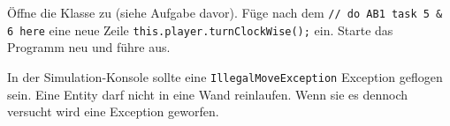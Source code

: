 Öffne die Klasse zu  (siehe Aufgabe davor).
Füge nach dem \texttt{// do AB1 task 5 \& 6 here} eine neue Zeile \texttt{this.player.turnClockWise();} ein.
Starte das Programm neu und führe  aus.

In der Simulation-Konsole sollte eine \texttt{IllegalMoveException} Exception geflogen sein.
Eine Entity darf nicht in eine Wand reinlaufen.
Wenn sie es dennoch versucht wird eine Exception geworfen.